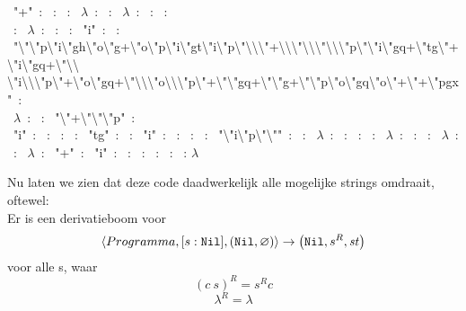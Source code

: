 \begin{smurf}
	\footnotesize
	
	\StmPush~"+"~: 
	\StmInput~: 
	\StmCat~: 
	\StmPush~$\lambda$~: 
	\StmPut~: 
	\StmPush~$\lambda$~: 
	\StmGet~: 
	\StmTail~:\\
	\StmGet~: 
	\StmPush~$\lambda$~: 
	\StmGet~: 
	\StmTail~: 
	\StmPush~"i"~: 
	\StmPut~:\\
	\StmPush~"\textbackslash{}"\textbackslash{}"p\textbackslash{}"i\textbackslash{}"gh\textbackslash{}"o\textbackslash{}"g+\textbackslash{}"o\textbackslash{}"p\textbackslash{}"i\textbackslash{}"gt\textbackslash{}"i\textbackslash{}"p\textbackslash{}"\textbackslash{}\textbackslash{}\textbackslash{}"+\textbackslash{}\textbackslash{}\textbackslash{}"\textbackslash{}\textbackslash{}\textbackslash{}"\textbackslash{}\textbackslash{}\textbackslash{}"p\textbackslash{}"\textbackslash{}"i\textbackslash{}"gq+\textbackslash{}"tg\textbackslash{}"+\textbackslash{}"i\textbackslash{}"gq+\textbackslash{}"\textbackslash{}\textbackslash{}\\
    \textbackslash{}"i\textbackslash{}\textbackslash{}\textbackslash{}"p\textbackslash{}"+\textbackslash{}"o\textbackslash{}"gq+\textbackslash{}"\textbackslash{}\textbackslash{}\textbackslash{}"o\textbackslash{}\textbackslash{}\textbackslash{}"p\textbackslash{}"+\textbackslash{}"\textbackslash{}"gq+\textbackslash{}"\textbackslash{}"g+\textbackslash{}"\textbackslash{}"p\textbackslash{}"o\textbackslash{}"gq\textbackslash{}"o\textbackslash{}"+\textbackslash{}"+\textbackslash{}"pgx"~:\\
	\StmPush~$\lambda$~: 
	\StmPut~: 
	\StmPush~"\textbackslash{}"+\textbackslash{}"\textbackslash{}"\textbackslash{}"p"~:\\
	\StmPush~"i"~: 
	\StmGet~: 
	\StmQuotify~: 
	\StmCat~: 
	\StmPush~"tg"~: 
	\StmCat~: 
	\StmPush~"i"~: 
	\StmGet~: 
	\StmQuotify~: 
	\StmCat~: 
	\StmPush~"\textbackslash{}"i\textbackslash{}"p\textbackslash{}"\textbackslash{}""~: 
	\StmCat~: 
	\StmPush~$\lambda$~: 
	\StmGet~: 
	\StmQuotify~: 
	\StmCat~: 
	\StmPush~$\lambda$~: 
	\StmGet~: 
	\StmCat~: 
	\StmPush~$\lambda$~: 
	\StmPut~: 
	\StmPush~$\lambda$~: 
	\StmPush~"+"~: 
	\StmPush~"i"~: 
	\StmGet~: 
	\StmCat~: 
	\StmPut~: 
	\StmGet~: 
	\StmExec~: 
    $\lambda$

    
\end{smurf}

Nu laten we zien dat deze code daadwerkelijk alle mogelijke strings omdraait, oftewel:\\
Er is een derivatieboom voor
$$
\left\langle Programma,[s:\texttt{Nil}],(\texttt{Nil},\varnothing)\right\rangle\to\left(\texttt{Nil},s^R,\mathit{st}\right)
$$
voor alle s, waar
$$(c~s)^R=s^R c$$
$$\lambda^R=\lambda$$

